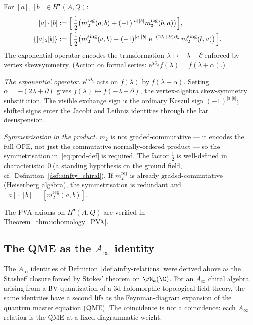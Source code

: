 For $[a],[b]\in H^\bullet(A,Q)$:
\begin{align}
\label{eq:prod-def}
[a]\cdot[b] &:= \Bigl[\, \frac12\bigl(m_2^{\mathrm{reg}}(a,b) + (-1)^{|a||b|}m_2^{\mathrm{reg}}(b,a)\bigr)\,\Bigr],\\
\label{eq:bracket-def}
\{[a]{}_\lambda [b]\} &:= \Bigl[\, \frac12\bigl(m_2^{\mathrm{sing}}(a,b) - (-1)^{|a||b|}\; \mathrm{e}^{-(2\lambda+\partial)\partial_\lambda}\,m_2^{\mathrm{sing}}(b,a)\bigr)\,\Bigr].
\end{align}
The exponential operator encodes the transformation $\lambda\mapsto -\lambda-\partial$ enforced by vertex skewsymmetry. (Action on formal series: $\mathrm{e}^{\alpha\partial_\lambda}f(\lambda)=f(\lambda+\alpha)$.)

\smallskip\noindent
\emph{The exponential operator.}\;
$\mathrm{e}^{\alpha\partial_\lambda}$ acts on $f(\lambda)$ by
$f(\lambda+\alpha)$. Setting $\alpha = -(2\lambda+\partial)$ gives
$f(\lambda) \mapsto f(-\lambda-\partial)$, the vertex-algebra
skew-symmetry substitution. The visible exchange sign is the
ordinary Koszul sign $(-1)^{|a||b|}$; shifted signs enter the
Jacobi and Leibniz identities through the bar desuspension.

\smallskip\noindent
\emph{Symmetrisation in the product.}\;
$m_2$ is not graded-commutative — it encodes the full OPE, not
just the commutative normally-ordered product — so the
symmetrisation in~\eqref{eq:prod-def} is required. The factor
$\frac{1}{2}$ is well-defined in characteristic~$0$ (a standing
hypothesis on the ground field, cf.\
Definition~\ref{def:ainfty_chiral}). If $m_2^{\mathrm{reg}}$ is
already graded-commutative (Heisenberg algebra), the symmetrisation
is redundant and $[a]\cdot[b] = [m_2^{\mathrm{reg}}(a,b)]$.

The PVA axioms on $H^\bullet(A, Q)$ are verified in
Theorem~\ref{thm:cohomology_PVA}.

\subsection{The QME as the $A_\infty$ identity}
\label{subsec:qme-ainfty}

The $A_\infty$ identities of Definition~\ref{def:ainfty-relations} were derived above as the Stasheff closure forced by Stokes' theorem on $\FM_k(\C)$. For an $A_\infty$ chiral algebra arising from a BV quantization of a 3d holomorphic-topological field theory, the same identities have a second life as the Feynman-diagram expansion of the quantum master equation (QME). The coincidence is not a coincidence: each $A_\infty$ relation is the QME at a fixed diagrammatic weight.

